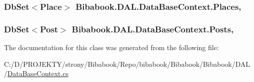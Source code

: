 \subsubsection[{Places}]{\setlength{\rightskip}{0pt plus 5cm}Db\+Set$<${\bf Place}$>$ Bibabook.\+D\+A\+L.\+Data\+Base\+Context.\+Places\hspace{0.3cm}{\ttfamily [get]}, {\ttfamily [set]}}\label{class_bibabook_1_1_d_a_l_1_1_data_base_context_ae422d8e897c183f9913ae6bd3a863e9e}
\hypertarget{class_bibabook_1_1_d_a_l_1_1_data_base_context_ab3f78c1cbb963e45175b4509016d3bad}{}
\subsubsection[{Posts}]{\setlength{\rightskip}{0pt plus 5cm}Db\+Set$<${\bf Post}$>$ Bibabook.\+D\+A\+L.\+Data\+Base\+Context.\+Posts\hspace{0.3cm}{\ttfamily [get]}, {\ttfamily [set]}}\label{class_bibabook_1_1_d_a_l_1_1_data_base_context_ab3f78c1cbb963e45175b4509016d3bad}


The documentation for this class was generated from the following file\+:\begin{DoxyCompactItemize}
\item 
C\+:/\+D/\+P\+R\+O\+J\+E\+K\+T\+Y/strony/\+Bibabook/\+Repo/bibabook/\+Bibabook/\+Bibabook/\+D\+A\+L/\hyperlink{_data_base_context_8cs}{Data\+Base\+Context.\+cs}\end{DoxyCompactItemize}
